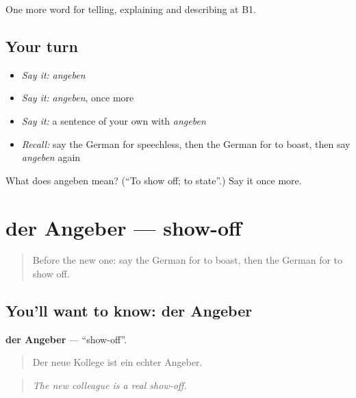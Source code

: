 \begin{grammarlens}[title={What you've built}]
One more word for telling, explaining and describing at B1.
\end{grammarlens}

\subsection*{Your turn}
\begin{itemize}
\raggedright
  \item \emph{Say it:} \emph{angeben}
  \item \emph{Say it:} \emph{angeben}, once more
  \item \emph{Say it:} a sentence of your own with \emph{angeben}
  \item \emph{Recall:} say the German for speechless, then the German for to boast, then say \emph{angeben} again
\end{itemize}

\begin{tcolorbox}[breakable,colback=teal!4,colframe=teal!35!black,title={Before you move on}]
What does angeben mean? (\textquotedblleft{}To show off; to state\textquotedblright{}.) Say it once more.
\end{tcolorbox}
\section[der Angeber]{der Angeber — show-off}

\label{lesson:GE-C475-angeber}



\begin{quote}
Before the new one: say the German for to boast, then the German for to show off.
\end{quote}

\subsection*{You'll want to know: der Angeber}
\textbf{der Angeber} — \textquotedblleft{}show-off\textquotedblright{}.

\begin{quote}
Der neue Kollege ist ein echter Angeber.
\end{quote}

\begin{quote}
\emph{The new colleague is a real show-off.}
\end{quote}

